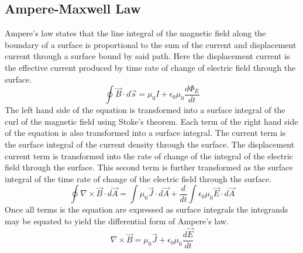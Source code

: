 \vspace{1cm}
\subsection{Ampere-Maxwell Law}
Ampere's law states that the line integral of the magnetic field along the boundary of a surface is proportional to the sum of the current and displacement current through a surface bound by said path.  Here the displacement current is the effective current produced by time rate of change of electric field through the surface.
$$\oint\overrightarrow{B}\cdot d\overrightarrow{s}=\mu_0 I+\epsilon_0\mu_0\frac{d\Phi_E}{dt}$$
The left hand side of the equation is transformed into a surface integral of the curl of the magnetic field using Stoke's theorem.  Each term of the right hand side of the equation is also transformed into a surface integral.  The current term is the surface integral of the current density through the surface.  The displacement current term is transformed into the rate of change of the integral of the electric field through the surface.  This second term is further transformed as the surface integral of the time rate of change of the electric field through the surface.
$$ \oint \nabla \times \overrightarrow{B} \cdot d\overrightarrow{A}=\int\mu_0 \overrightarrow{J}\cdot d\overrightarrow{A}+\frac{d}{dt}\int\epsilon_0\mu_0 \overrightarrow{E}\cdot d\overrightarrow{A}$$
Once all terms is the equation are expressed as surface integrals the integrands may be equated to yield the differential form of Ampere's law.
$$\nabla \times \overrightarrow{B} = \mu_0 \overrightarrow{J} +\epsilon_0\mu_0\frac{d\overrightarrow{E}}{dt}  $$


